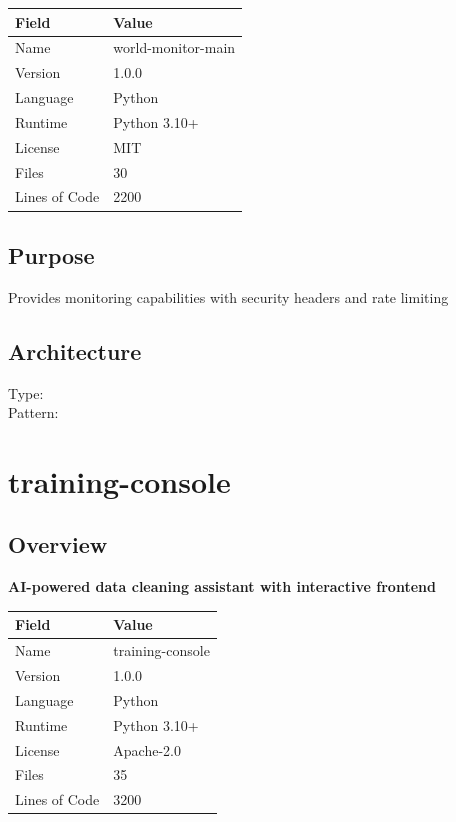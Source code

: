 \documentclass[11pt,a4paper]{article}
\begin{document}
\begin{tabular}{@{}ll@{}}
\toprule
\textbf{Field} & \textbf{Value} \\
\midrule
Name & world-monitor-main \\
Version & 1.0.0 \\
Language & Python \\
Runtime & Python 3.10+ \\
License & MIT \\
Files & 30 \\
Lines of Code & 2200 \\
\bottomrule
\end{tabular}

\subsection{Purpose}
Provides monitoring capabilities with security headers and rate limiting

\subsection{Architecture}
Type:  \\
Pattern: 



\newpage


\section{training-console}

\subsection{Overview}

\textbf{AI-powered data cleaning assistant with interactive frontend}

\begin{tabular}{@{}ll@{}}
\toprule
\textbf{Field} & \textbf{Value} \\
\midrule
Name & training-console \\
Version & 1.0.0 \\
Language & Python \\
Runtime & Python 3.10+ \\
License & Apache-2.0 \\
Files & 35 \\
Lines of Code & 3200 \\
\bottomrule
\end{tabular}
\end{document}
